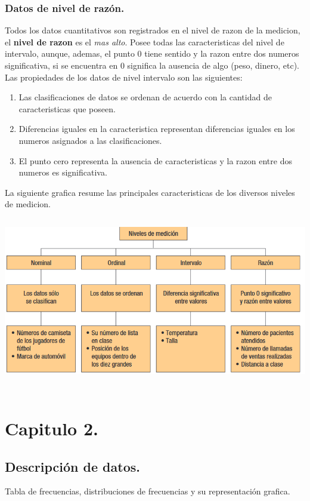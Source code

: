 \documentclass[]{article}
\begin{document}
\subsubsection*{Datos de nivel de razón.}
Todos los datos cuantitativos son registrados en el nivel de razon de la medicion, el \textbf{nivel de razon} es el \textit{mas alto}. Posee todas las caracteristicas del nivel de intervalo, aunque, ademas, el punto 0 tiene sentido y la razon entre dos numeros significativa, si se encuentra en 0 significa la ausencia de algo (peso, dinero, etc). Las propiedades de los datos de nivel intervalo son las siguientes:
\begin{enumerate}
	\item Las clasificaciones de datos se ordenan de acuerdo con la cantidad de caracteristicas que poseen.
	\item Diferencias iguales en la caracteristica representan diferencias iguales en los numeros asignados a las clasificaciones.
	\item El punto cero representa la ausencia de caracteristicas y la razon entre dos numeros es significativa.
\end{enumerate}
La siguiente grafica resume las principales caracteristicas de los diversos niveles de medicion.
\\
\includegraphics[width=16cm, height=8cm]{resumenCaracteristicasNivelesMedicion1_3}
\section{Capitulo 2.}
\subsection{Descripción de datos.}
{\large Tabla de frecuencias, distribuciones de frecuencias y su representación grafica.}
\end{document}

